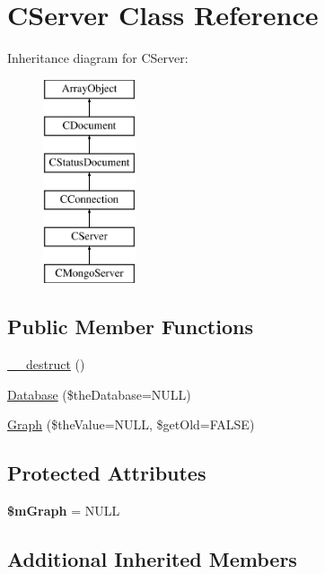 \hypertarget{class_c_server}{\section{C\-Server Class Reference}
\label{class_c_server}
}
Inheritance diagram for C\-Server\-:\begin{figure}[H]
\begin{center}
\leavevmode
\includegraphics[height=6.000000cm]{class_c_server}
\end{center}
\end{figure}
\subsection*{Public Member Functions}
\begin{DoxyCompactItemize}
\item 
\hyperlink{class_c_server_abd12c8fabeb71e0400b21dc8cf93b9b1}{\-\_\-\-\_\-destruct} ()
\item 
\hyperlink{class_c_server_ac6e9bd058443274b3da40534d2fc741a}{Database} (\$the\-Database=N\-U\-L\-L)
\item 
\hyperlink{class_c_server_a23ace9fcb220408b293378051da8c084}{Graph} (\$the\-Value=N\-U\-L\-L, \$get\-Old=F\-A\-L\-S\-E)
\end{DoxyCompactItemize}
\subsection*{Protected Attributes}
\begin{DoxyCompactItemize}
\item 
\hypertarget{class_c_server_a7f59b9daedcaff19e284a38be45cd12d}{{\bfseries \$m\-Graph} = N\-U\-L\-L}\label{class_c_server_a7f59b9daedcaff19e284a38be45cd12d}

\end{DoxyCompactItemize}
\subsection*{Additional Inherited Members}


